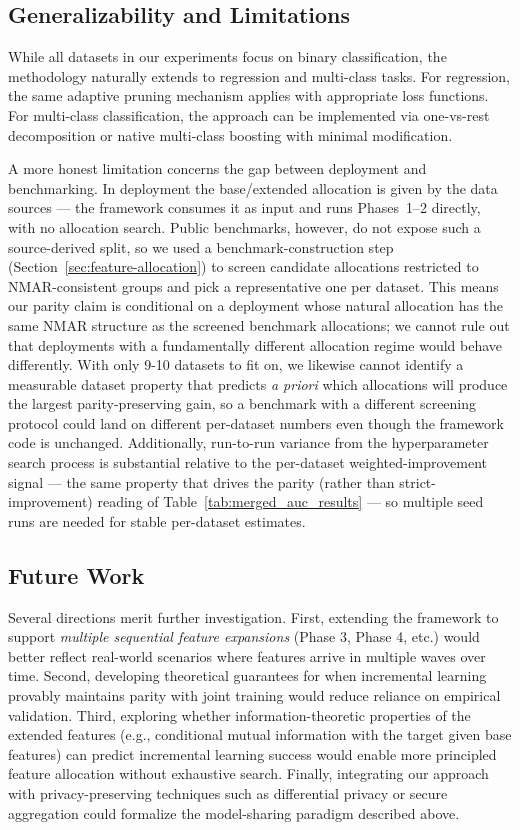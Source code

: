 \documentclass[sigconf]{acmart}
\begin{document}
\begin{itemize}
\subsection{Generalizability and Limitations}

While all datasets in our experiments focus on binary classification, the methodology naturally extends to regression and multi-class tasks. For regression, the same adaptive pruning mechanism applies with appropriate loss functions. For multi-class classification, the approach can be implemented via one-vs-rest decomposition or native multi-class boosting with minimal modification.

A more honest limitation concerns the gap between deployment and benchmarking. In deployment the base/extended allocation is given by the data sources --- the framework consumes it as input and runs Phases~1--2 directly, with no allocation search. Public benchmarks, however, do not expose such a source-derived split, so we used a benchmark-construction step (Section~\ref{sec:feature-allocation}) to screen candidate allocations restricted to NMAR-consistent groups and pick a representative one per dataset. This means our parity claim is conditional on a deployment whose natural allocation has the same NMAR structure as the screened benchmark allocations; we cannot rule out that deployments with a fundamentally different allocation regime would behave differently. With only 9-10 datasets to fit on, we likewise cannot identify a measurable dataset property that predicts \emph{a priori} which allocations will produce the largest parity-preserving gain, so a benchmark with a different screening protocol could land on different per-dataset numbers even though the framework code is unchanged. Additionally, run-to-run variance from the hyperparameter search process is substantial relative to the per-dataset weighted-improvement signal --- the same property that drives the parity (rather than strict-improvement) reading of Table~\ref{tab:merged_auc_results} --- so multiple seed runs are needed for stable per-dataset estimates.

\subsection{Future Work}

Several directions merit further investigation. First, extending the framework to support \textit{multiple sequential feature expansions} (Phase 3, Phase 4, etc.) would better reflect real-world scenarios where features arrive in multiple waves over time. Second, developing theoretical guarantees for when incremental learning provably maintains parity with joint training would reduce reliance on empirical validation. Third, exploring whether information-theoretic properties of the extended features (e.g., conditional mutual information with the target given base features) can predict incremental learning success would enable more principled feature allocation without exhaustive search. Finally, integrating our approach with privacy-preserving techniques such as differential privacy or secure aggregation could formalize the model-sharing paradigm described above.


\end{itemize}
\end{document}
